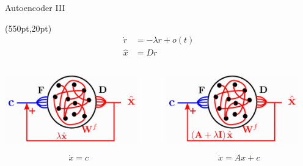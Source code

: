 \documentclass[17pt, t, lualatex]{beamer}
\begin{document}
\begin{frame}{Autoencoder III}
	\begin{textblock*}{10pt}(550pt,20pt)
		\small
		\begin{equation*}
			\begin{aligned}
				\dot{r} &= -\lambda r + o(t)\\
				\hat{x} &= Dr
			\end{aligned}
		\end{equation*}
	\end{textblock*}
	\begin{columns}[T]
		\begin{column}{0.48\textwidth}
			\begin{center}
				\includegraphics[width=0.9\textwidth,trim= 3cm 3cm 3cm 0cm]{figures/autoencoder3.png}
			\end{center}

			\begin{equation}
			\dot{x} = c
			\end{equation}
		\end{column}

		\begin{column}{0.48\textwidth}
			\begin{center}
				\includegraphics[width=0.9\textwidth,trim= 3cm 3cm 3cm 0cm]{figures/autoencoder4.png}
			\end{center}

			\begin{equation}
			\dot{x} = Ax + c
			\end{equation}
		\end{column}
	\end{columns}
\end{frame}
\end{document}
